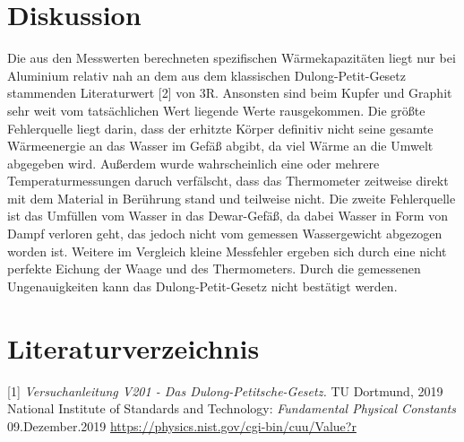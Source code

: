 \documentclass[titlepage = firstcover]{scrartcl}
\begin{document}
            \newpage
        
    \section{Diskussion}
        Die aus den Messwerten berechneten spezifischen Wärmekapazitäten liegt nur bei Aluminium relativ nah an dem aus dem klassischen Dulong-Petit-Gesetz
        stammenden Literaturwert [2] von 3R. Ansonsten sind beim Kupfer und Graphit sehr weit vom tatsächlichen Wert liegende Werte rausgekommen.
        Die größte Fehlerquelle liegt darin, dass der  erhitzte Körper definitiv nicht seine gesamte Wärmeenergie an das Wasser im Gefäß abgibt, da viel
        Wärme an die Umwelt abgegeben wird. Außerdem wurde wahrscheinlich eine oder mehrere Temperaturmessungen daruch verfälscht, dass das Thermometer
        zeitweise direkt mit dem Material in Berührung stand und teilweise nicht.
        Die zweite Fehlerquelle ist das Umfüllen vom Wasser in das Dewar-Gefäß, da dabei Wasser in Form von Dampf verloren geht, das jedoch nicht vom gemessen 
        Wassergewicht abgezogen worden ist. Weitere im Vergleich kleine Messfehler ergeben sich durch eine nicht perfekte Eichung der Waage und des
        Thermometers. Durch die gemessenen Ungenauigkeiten kann das Dulong-Petit-Gesetz nicht bestätigt werden.

    \newpage
    
    \section{Literaturverzeichnis}
        [1] \textit{Versuchanleitung V201 - Das Dulong-Petitsche-Gesetz.} TU Dortmund, 2019 \newline
        [2] National Institute of Standards and Technology: \textit{Fundamental Physical Constants} 09.Dezember.2019
            \url{https://physics.nist.gov/cgi-bin/cuu/Value?r}
        
\end{document}

